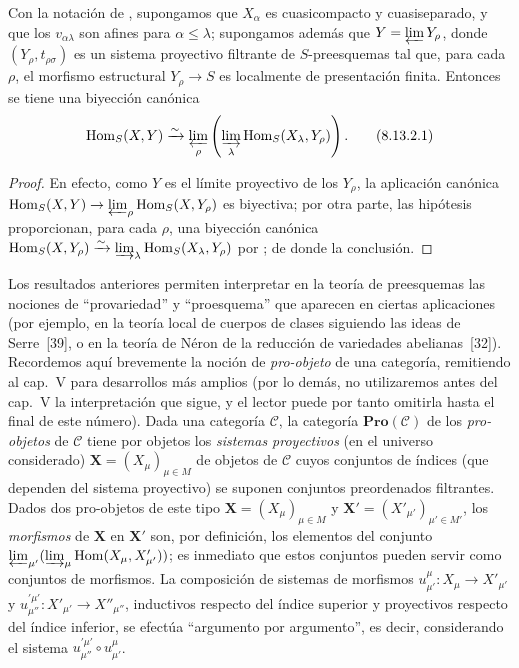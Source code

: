 \begin{corollary}[8.13.2]
\label{IV.8.13.2}
Con la notación de , supongamos que $X_\alpha$ es cuasicompacto y cuasiseparado, y que los $v_{\alpha\lambda}$ son afines para $\alpha\leqslant\lambda$; supongamos además que $Y=\varprojlim Y_\rho$, donde $(Y_\rho,t_{\rho\sigma})$ es un sistema proyectivo filtrante de $S$-preesquemas tal que, para cada $\rho$, el morfismo estructural $Y_\rho\to S$ es localmente de presentación finita.
Entonces se tiene una biyección canónica
\begin{equation}
\label{IV.8.13.2.1}
\operatorname{Hom}_S(X,Y)\xrightarrow{\sim}\varprojlim_\rho\left(\varinjlim_\lambda\operatorname{Hom}_S(X_\lambda,Y_\rho)\right). \tag{8.13.2.1}
\end{equation}
\end{corollary}

\begin{proof}
En efecto, como $Y$ es el límite proyectivo de los $Y_\rho$, la aplicación canónica $\operatorname{Hom}_S(X,Y)\to\varprojlim_\rho\operatorname{Hom}_S(X,Y_\rho)$ es biyectiva; por otra parte, las hipótesis proporcionan, para cada $\rho$, una biyección canónica $\operatorname{Hom}_S(X,Y_\rho)\xrightarrow{\sim}\varinjlim_\lambda\operatorname{Hom}_S(X_\lambda,Y_\rho)$ por ; de donde la conclusión.
\end{proof}

\begin{env}[8.13.3]
\label{IV.8.13.3}
Los resultados anteriores permiten interpretar en la teoría de preesquemas las nociones de ``provariedad'' y ``proesquema'' que aparecen en ciertas aplicaciones (por ejemplo, en la teoría local de cuerpos de clases siguiendo las ideas de Serre~[39], o en la teoría de N\'eron de la reducción de
variedades abelianas~[32]).
Recordemos aquí brevemente la noción de \emph{pro-objeto} de una categoría, remitiendo al cap.~V para desarrollos más amplios (por lo demás, no utilizaremos antes del cap.~V la interpretación que sigue, y el lector puede por tanto omitirla hasta el final de este número).
Dada una categoría $\mathcal{C}$, la categoría $\mathbf{Pro}(\mathcal{C})$ de los \emph{pro-objetos} de $\mathcal{C}$ tiene por objetos los \emph{sistemas proyectivos} (en el universo considerado) $\mathbf{X}=(X_\mu)_{\mu\in M}$ de objetos de $\mathcal{C}$ cuyos conjuntos de índices (que dependen del sistema proyectivo) se suponen conjuntos preordenados filtrantes.
Dados dos pro-objetos de este tipo $\mathbf{X}=(X_\mu)_{\mu\in M}$ y $\mathbf{X}'=(X'_{\mu'})_{\mu'\in M'}$, los \emph{morfismos} de $\mathbf{X}$ en $\mathbf{X}'$ son, por definición, los elementos del conjunto $\varprojlim_{\mu'}(\varinjlim_\mu\operatorname{Hom}(X_\mu,X'_{\mu'}))$; es inmediato que estos conjuntos pueden servir como conjuntos de morfismos. La composición de sistemas de morfismos $u_{\mu'}^\mu:X_\mu\to X'_{\mu'}$ y $u_{\mu''}^{\prime\mu'}:X'_{\mu'}\to X''_{\mu''}$, inductivos respecto del índice superior y proyectivos respecto del índice inferior, se efectúa ``argumento por argumento'', es decir, considerando el sistema $u_{\mu''}^{\prime\mu'}\circ u_{\mu'}^\mu$.
\end{env}

